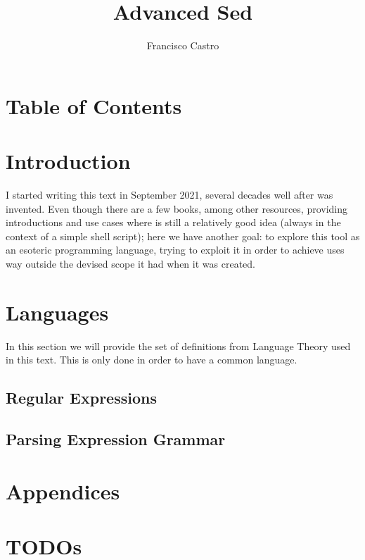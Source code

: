 \documentclass[12pt,a4paper]{article}
\author{Francisco Castro}
\title{Advanced Sed}
\begin{document}
\maketitle

\section{Table of Contents}
\tableofcontents


\section{Introduction}

I started writing this text in September 2021,
several decades well after \sed* was invented.
Even though there are a few books, among other resources,
providing introductions and use cases where \sed* is still a
relatively good idea (always in the context of a simple shell script);
here we have another goal:
to explore this tool as an esoteric programming language,
trying to exploit it in order to achieve uses
way outside the devised scope it had when it was created.




\section{Languages}

In this section we will provide the set of definitions from Language Theory
used in this text.  This is only done in order to have a common language.
\subsection{Regular Expressions}
\subsection{Parsing Expression Grammar}






\section{Appendices}
\appendix

\section{TODOs}
\todos
\end{document}
